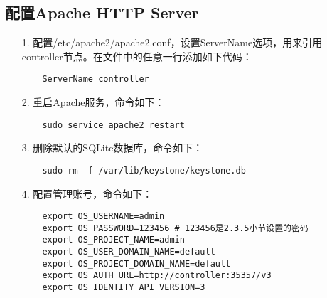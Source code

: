 \documentclass[a4paper,left=2.5cm,right=2.5cm,11pt]{article}
\begin{document}
\subsection{配置Apache HTTP Server}
	\begin{itemize}
		\item[1.] 配置/etc/apache2/apache2.conf，设置ServerName选项，用来引用controller节点。在文件中的任意一行添加如下代码：
		\begin{lstlisting}
	ServerName controller
		\end{lstlisting}

		\item[2.] 重启Apache服务，命令如下：
		\begin{lstlisting}
	sudo service apache2 restart
		\end{lstlisting}

		\item[3.] 删除默认的SQLite数据库，命令如下：
		\begin{lstlisting}
	sudo rm -f /var/lib/keystone/keystone.db
		\end{lstlisting}

		\item[4.] 配置管理账号，命令如下：
		\begin{lstlisting}
	export OS_USERNAME=admin
	export OS_PASSWORD=123456 # 123456是2.3.5小节设置的密码
	export OS_PROJECT_NAME=admin
	export OS_USER_DOMAIN_NAME=default
	export OS_PROJECT_DOMAIN_NAME=default
	export OS_AUTH_URL=http://controller:35357/v3
	export OS_IDENTITY_API_VERSION=3
		\end{lstlisting}
	\end{itemize}
	
\end{document}
